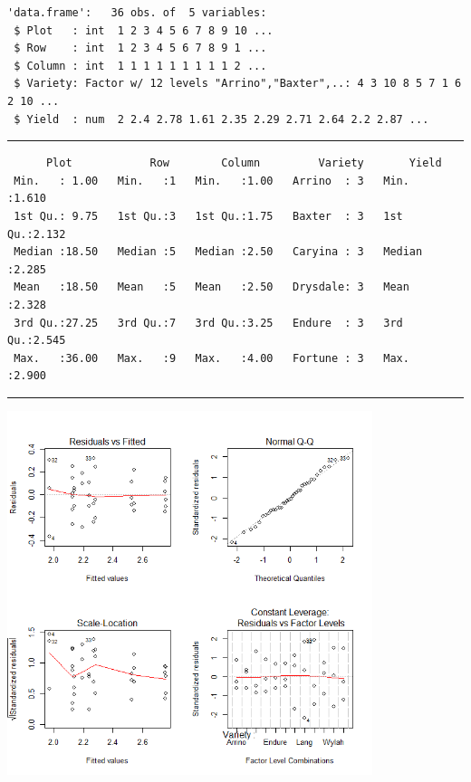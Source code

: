 \documentclass[a4paper, 10pt, fleqn, twosided]{memoir}
\begin{document}
\begin{tcolorbox}[title = Exercise 1 output]
\begin{verbatim}
'data.frame':   36 obs. of  5 variables:
 $ Plot   : int  1 2 3 4 5 6 7 8 9 10 ...
 $ Row    : int  1 2 3 4 5 6 7 8 9 1 ...
 $ Column : int  1 1 1 1 1 1 1 1 1 2 ...
 $ Variety: Factor w/ 12 levels "Arrino","Baxter",..: 4 3 10 8 5 7 1 6 2 10 ...
 $ Yield  : num  2 2.4 2.78 1.61 2.35 2.29 2.71 2.64 2.2 2.87 ...
\end{verbatim}
{\color{outpt} {\hrule height 1pt}}
\begin{verbatim}
      Plot            Row        Column         Variety       Yield
 Min.   : 1.00   Min.   :1   Min.   :1.00   Arrino  : 3   Min.   :1.610
 1st Qu.: 9.75   1st Qu.:3   1st Qu.:1.75   Baxter  : 3   1st Qu.:2.132
 Median :18.50   Median :5   Median :2.50   Caryina : 3   Median :2.285
 Mean   :18.50   Mean   :5   Mean   :2.50   Drysdale: 3   Mean   :2.328
 3rd Qu.:27.25   3rd Qu.:7   3rd Qu.:3.25   Endure  : 3   3rd Qu.:2.545
 Max.   :36.00   Max.   :9   Max.   :4.00   Fortune : 3   Max.   :2.900
 \end{verbatim}
{\color{outpt} {\hrule height 1pt}}
\includegraphics[width=0.8\textwidth, frame]{Exercise1Resplot.png}
\end{tcolorbox}
\end{document}

